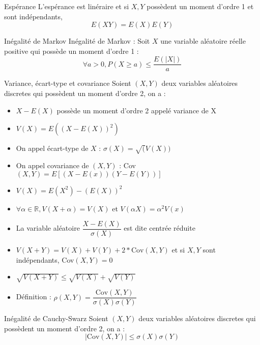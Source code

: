 \documentclass[french, a4paper, 10pt, twocolumn]{article}
\newcommand{\R}{\mathbb{R}}   %
\begin{document}
\begin{theoreme}{Espérance}
    L'espérance est linéraire et si \(X,Y\) possèdent un moment d'ordre 1 et sont indépendants,
    \[E(XY)=E(X)E(Y)\]
\end{theoreme}

\begin{theoreme}{Inégalité de Markov}
    Inégalité de Markov : Soit $X$ une variable aléatoire réelle positive qui possède un moment d'ordre 1 :
     \[\forall a>0, {P(X\geqslant a)\leqslant \frac{E(|X|)}{a}}\]
\end{theoreme}
 
\begin{definition}{Variance, écart-type et covariance}
    Soient \((X,Y)\) deux variables aléatoires discretes qui possèdent un moment d'ordre 2, on a :
    \begin{itemize}[label=\(\bullet\)]
        \item \(X-E(X)\) possède un moment d'ordre 2 appelé variance de X
        \item \(V(X)=E((X-E(X))^2)\)
        \item On appel écart-type de \(X\) : \(\sigma(X)=\sqrt(V(X))\)
        \item On appel covariance de \((X,Y)\) : Cov\((X,Y)=E[(X-E(x))(Y-E(Y))]\)
    \end{itemize}

    \tcblower
    \begin{itemize}
        \item \(V(X)=E(X^2)-(E(X))^2\)
        \item \(\forall \alpha \in \R, V(X+\alpha)=V(X)\) et \(V(\alpha X)=\alpha^2V(x)\)
        \item La variable aléatoire \(\dfrac{X-E(X)}{\sigma(X)}\) est dite centrée réduite
        \item \(V(X+Y)=V(X)+V(Y)+2*\text{Cov}(X,Y)\) et si \(X,Y\) sont indépendants, Cov\((X,Y)=0\)
        \item \(\sqrt{V(X+Y)}\leq\sqrt{V(X)}+\sqrt{V(Y)}\)
        \item Définition : \(\rho(X,Y)=\dfrac{\text{Cov}(X,Y)}{\sigma(X)\sigma(Y)}\)
    \end{itemize}
\end{definition}

\begin{theoreme}{Inégalité de Cauchy-Swarz}
    Soient \((X,Y)\) deux variables aléatoires discretes qui possèdent un moment d'ordre 2, on a :
        \[|\text{Cov}(X,Y)|\leq \sigma(X)\sigma(Y)\] 
\end{theoreme}
\end{document}
